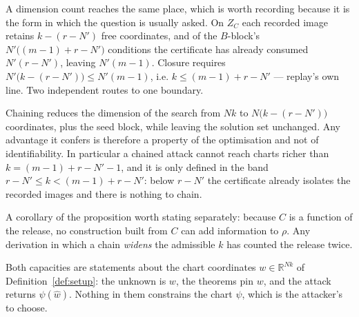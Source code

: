 \begin{center}
A dimension count reaches the same place, which is worth recording because it
is the form in which the question is usually asked. On $Z_C$ each recorded
image retains $k-(r-N')$ free coordinates, and of the $B$-block's
$N'\bigl((m-1)+r-N'\bigr)$ conditions the certificate has already consumed
$N'(r-N')$, leaving $N'(m-1)$. Closure requires
$N'\bigl(k-(r-N')\bigr)\le N'(m-1)$, i.e. $k\le(m-1)+r-N'$ --- replay's own
line. Two independent routes to one boundary.

\begin{corollary}\label{cor:chainbasin}
Chaining reduces the dimension of the search from $Nk$ to $N\bigl(k-(r-N')\bigr)$
coordinates, plus the seed block, while leaving the solution set unchanged.
Any advantage it confers is therefore a property of the optimisation and not
of identifiability. In particular a chained attack cannot reach charts richer
than $k=(m-1)+r-N'-1$, and it is only defined in the band
$r-N'\le k<(m-1)+r-N'$: below $r-N'$ the certificate already isolates the
recorded images and there is nothing to chain.
\end{corollary}

\noindent A corollary of the proposition worth stating separately: because
$C$ is a function of the release, no construction built from $C$ can add
information to $\rho$. Any derivation in which a chain \emph{widens} the
admissible $k$ has counted the release twice.
\end{center}
Both capacities are statements about the chart coordinates $w\in\mathbb R^{Nk}$
of Definition~\ref{def:setup}: the unknown is $w$, the theorems pin $w$, and
the attack returns $\psi(\hat w)$. Nothing in them constrains the chart
$\psi$, which is the attacker's to choose.

